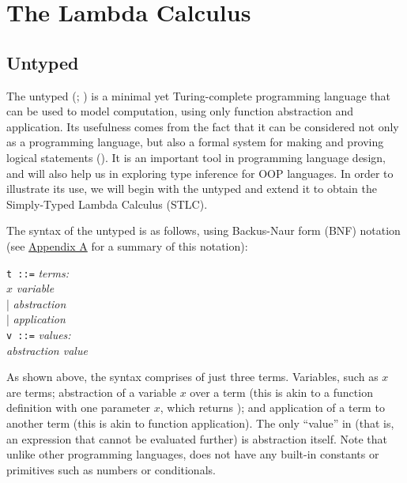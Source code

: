 \section{The Lambda Calculus}

\subsection{Untyped \lambdacalc{}}

The untyped \lambdacalc{} (\cite{church1936}; \cite{church1941}) is a minimal yet Turing-complete programming language that can be used to model computation, using only function abstraction and application. Its usefulness comes from the fact that it can be considered not only as a programming language, but also a formal system for making and proving logical statements (\cite{pierce}). It is an important tool in programming language design, and will also help us in exploring type inference for OOP languages. In order to illustrate its use, we will begin with the untyped \lambdacalc{} and extend it to obtain the Simply-Typed Lambda Calculus (STLC).

The syntax of the untyped \lambdacalc{} is as follows, using Backus-Naur form (BNF) notation (see \hyperref[sec:AppA]{Appendix A} for a summary of this notation):
\begin{center}
\texttt{t ::=} 						\hfill \textit{terms:} \\
\hspace{2em} $x$ 					\hfill \textit{variable} \\
\hspace{2em} | 	\hfill \textit{abstraction} \\
\hspace{2em} |   	\hfill \textit{application} \\
\texttt{v ::=} 						\hfill \textit{values:} \\
\hspace{2em}  	\hfill \textit{abstraction value}
\end{center}
As shown above, the syntax comprises of just three terms. Variables, such as $x$ are terms; abstraction of a variable $x$ over a term  (this is akin to a function definition with one parameter $x$, which returns ); and application of a term to another term  \tm{}{} (this is akin to function application). The only ``value'' in \lambdacalc{} (that is, an expression that cannot be evaluated further) is abstraction itself. Note that unlike other programming languages, \lambdacalc{} does not have any built-in constants or primitives such as numbers or conditionals.

